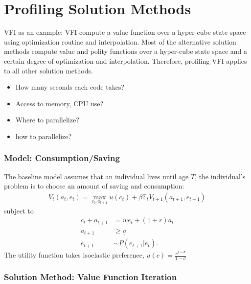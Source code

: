 \documentclass[12pt]{article}
\begin{document}
\clearpage
\section{Profiling Solution Methods}
VFI as an example: VFI compute a value function over a hyper-cube state space using optimization routine and interpolation. Most of the alternative solution methods compute value and polity functions over a hyper-cube state space and a certain degree of optimization and interpolation. Therefore, profiling VFI applies to all other solution methods. 
\begin{itemize}
\item How many seconds each code takes?
\item Access to memory, CPU use?
\item Where to parallelize?
\item how to parallelize?
\end{itemize}



\subsubsection*{Model: Consumption/Saving}
The baseline model assumes that an individual lives until age $T$, the individual's problem is to choose an amount of saving and consumption:
\begin{align*}
V_t(a_{t},e_t) = \max_{c_t,a_{t+1}} u(c_{t}) + \beta \mathbb{E}_t V_{t+1}(a_{t+1},e_{t+1})
\end{align*}
subject to
\begin{align*}
c_t + a_{t+1} 	&= w e_t + (1+r)a_t \\
a_{t+1} 		&\geq \underline{a}\\
e_{t+1} 		&\sim P(e_{t+1}|e_t).
\end{align*}
The utility function takes isoelastic preference, $u(c) = \frac{c^{1-\sigma}}{1-\sigma}$



\subsubsection*{Solution Method: Value Function Iteration}
\end{document}
